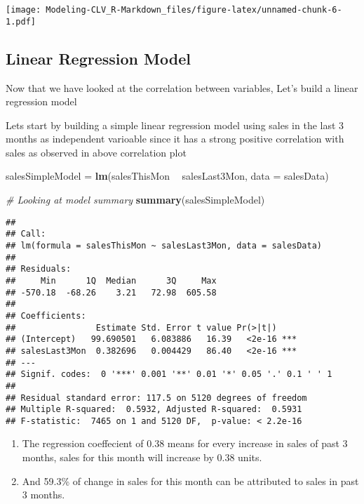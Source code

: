 \documentclass[
]{article}
\newenvironment{Shaded}{\begin{snugshade}}{\end{snugshade}}
\newcommand{\CommentTok}[1]{\textcolor[rgb]{0.56,0.35,0.01}{\textit{#1}}}
\newcommand{\DataTypeTok}[1]{\textcolor[rgb]{0.13,0.29,0.53}{#1}}
\newcommand{\KeywordTok}[1]{\textcolor[rgb]{0.13,0.29,0.53}{\textbf{#1}}}
\newcommand{\NormalTok}[1]{#1}
\newcommand{\OperatorTok}[1]{\textcolor[rgb]{0.81,0.36,0.00}{\textbf{#1}}}
\newcommand{\StringTok}[1]{\textcolor[rgb]{0.31,0.60,0.02}{#1}}
\providecommand{\tightlist}{%
  \setlength{\itemsep}{0pt}\setlength{\parskip}{0pt}}
\begin{document}
\texttt{[image: Modeling-CLV\_R-Markdown\_files/figure-latex/unnamed-chunk-6-1.pdf]}

\hypertarget{linear-regression-model}{%
\subsection{Linear Regression Model}\label{linear-regression-model}}

Now that we have looked at the correlation between variables, Let's
build a linear regression model

Lets start by building a simple linear regression model using sales in
the last 3 months as independent varioable since it has a strong
positive correlation with sales as observed in above correlation plot

\begin{Shaded}
\begin{Highlighting}[]
\NormalTok{salesSimpleModel =}\StringTok{ }\KeywordTok{lm}\NormalTok{(salesThisMon }\OperatorTok{~}\StringTok{ }\NormalTok{salesLast3Mon, }
                       \DataTypeTok{data =}\NormalTok{ salesData)}

\CommentTok{# Looking at model summary}
\KeywordTok{summary}\NormalTok{(salesSimpleModel)}
\end{Highlighting}
\end{Shaded}

\begin{verbatim}
## 
## Call:
## lm(formula = salesThisMon ~ salesLast3Mon, data = salesData)
## 
## Residuals:
##     Min      1Q  Median      3Q     Max 
## -570.18  -68.26    3.21   72.98  605.58 
## 
## Coefficients:
##                Estimate Std. Error t value Pr(>|t|)    
## (Intercept)   99.690501   6.083886   16.39   <2e-16 ***
## salesLast3Mon  0.382696   0.004429   86.40   <2e-16 ***
## ---
## Signif. codes:  0 '***' 0.001 '**' 0.01 '*' 0.05 '.' 0.1 ' ' 1
## 
## Residual standard error: 117.5 on 5120 degrees of freedom
## Multiple R-squared:  0.5932, Adjusted R-squared:  0.5931 
## F-statistic:  7465 on 1 and 5120 DF,  p-value: < 2.2e-16
\end{verbatim}

\begin{enumerate}
\def\labelenumi{\arabic{enumi}.}
\tightlist
\item
  The regression coeffecient of 0.38 means for every increase in sales
  of past 3 months, sales for this month will increase by 0.38 units.
\item
  And 59.3\% of change in sales for this month can be attributed to
  sales in past 3 months.
\end{enumerate}
\end{document}

